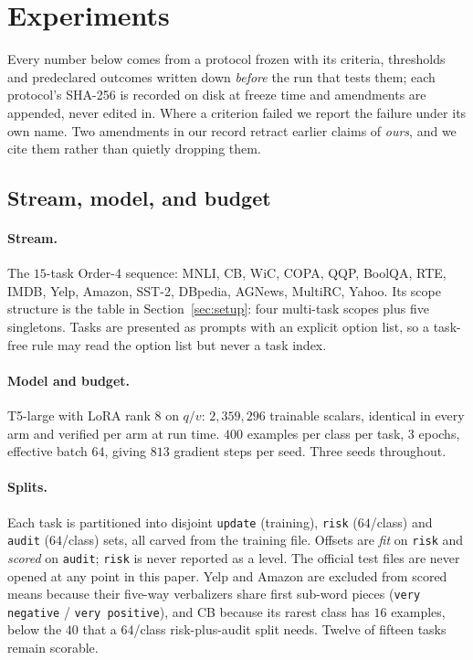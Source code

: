 \section{Experiments}
\label{sec:experiments}

Every number below comes from a protocol frozen with its criteria, thresholds and
predeclared outcomes written down \emph{before} the run that tests them; each
protocol's SHA-256 is recorded on disk at freeze time and amendments are appended,
never edited in. Where a criterion failed we report the failure under its own
name. Two amendments in our record retract earlier claims of \emph{ours}, and we
cite them rather than quietly dropping them.

\subsection{Stream, model, and budget}
\label{sec:setup-exp}

\paragraph{Stream.}
The $15$-task Order-4 sequence: MNLI, CB, WiC, COPA, QQP, BoolQA, RTE, IMDB,
Yelp, Amazon, SST-2, DBpedia, AGNews, MultiRC, Yahoo. Its scope structure is the
table in Section~\ref{sec:setup}: four multi-task scopes plus five singletons.
Tasks are presented as prompts with an explicit option list, so a task-free rule
may read the option list but never a task index.

\paragraph{Model and budget.}
T5-large with LoRA rank $8$ on $q/v$: $2{,}359{,}296$ trainable scalars, identical
in every arm and verified per arm at run time. $400$ examples per class per task,
$3$ epochs, effective batch $64$, giving $813$ gradient steps per seed. Three
seeds throughout.

\paragraph{Splits.}
Each task is partitioned into disjoint \texttt{update} (training),
\texttt{risk} ($64$/class) and \texttt{audit} ($64$/class) sets, all carved from
the training file. Offsets are \emph{fit} on \texttt{risk} and \emph{scored} on
\texttt{audit}; \texttt{risk} is never reported as a level. The official test
files are never opened at any point in this paper. Yelp and Amazon are excluded
from scored means because their five-way verbalizers share first sub-word pieces
(\texttt{very negative} / \texttt{very positive}), and CB because its rarest class
has $16$ examples, below the $40$ that a $64$/class risk-plus-audit split needs.
Twelve of fifteen tasks remain scorable.

